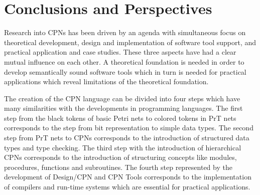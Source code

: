 \section{Conclusions and Perspectives}

Research into CPNs has been driven by an agenda with simultaneous
focus on theoretical development, design and implementation of
software tool support, and practical application and case
studies. These three aspects have had a clear mutual influence on each
other. A theoretical foundation is needed in order to develop
semantically sound software tools which in turn is needed for
practical applications which reveal limitations of the theoretical
foundation.



The creation of the CPN language can be divided into four steps which
have many similarities with the developments in programming
languages. The first step from the black tokens of basic Petri nets to
colored tokens in PrT nets corresponds to the step from bit
representation to simple data types. The second step from PrT nets to
CPNs corresponds to the introduction of structured data types and type
checking. The third step with the introduction of hierarchical CPNs
corresponds to the introduction of structuring concepts like modules,
procedures, functions and subroutines. The fourth step represented by
the development of Design/CPN and CPN Tools corresponds to the
implementation of compilers and run-time systems which are essential
for practical applications.

